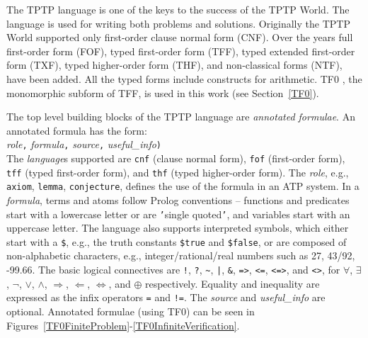 \documentclass[letterpaper]{article}
\newcommand{\smalltt}[1]{\small \texttt{#1}}
\begin{document}
The TPTP language \cite{Sut22-IGPL} is one of the keys to the success of the TPTP World.
The language is used for writing both problems and solutions.
Originally the TPTP World supported only first-order clause normal form (CNF).
Over the years full first-order form (FOF),
typed first-order form (TFF),
typed extended first-order form (TXF),
typed higher-order form (THF),
and non-classical forms (NTF),
have been added.
All the typed forms include constructs for arithmetic.
TF0 \cite{SS+12}, the monomorphic subform of TFF, is used in this work (see Section~\ref{TF0}).

The top level building blocks of the TPTP language are {\em annotated formulae}.
An annotated formula has the form:\\
{\em role}{\tt ,}
{\em formula}{\tt ,}
{\em source}{\tt ,}
{\em useful\_info}{\tt )}\\
The {\em language}s supported are {\smalltt{cnf}} (clause normal form), {\smalltt{fof}}
(first-order form), {\smalltt{tff}} (typed first-order form), and {\smalltt{thf}}
(typed higher-order form).
The {\em role}, e.g., {\smalltt{axiom}}, {\smalltt{lemma}}, {\smalltt{conjecture}},
defines the use of the formula in an ATP system.
In a {\em formula}, terms and atoms follow Prolog conventions
-- functions and predicates start with a lowercase letter or are {\tt '}single quoted{\tt '}, and 
variables start with an uppercase letter.
The language also supports interpreted symbols, which either start with a {\tt \$}, e.g., 
the truth constants {\smalltt{\$true}} and {\smalltt{\$false}}, or are composed of 
non-alphabetic characters, e.g., integer/rational/real numbers such as 27, 43/92, -99.66.
The basic logical connectives are
{\tt !}, {\tt ?}, {\tt \verb|~|}, {\tt |}, {\tt \&}, {\tt =>}, {\tt <=}, {\tt <=>}, and 
{\tt <{\raisebox{0.4ex}{\texttildelow}}>},
for
$\forall$, $\exists$, $\neg$, $\vee$, $\wedge$, $\Rightarrow$, $\Leftarrow$, $\Leftrightarrow$, 
and $\oplus$ respectively.
Equality and inequality are expressed as the infix operators {\tt =} and {\tt !=}.
The {\em source} and {\em useful\_info} are optional.
Annotated formulae (using TF0) can be seen in 
Figures~\ref{TF0FiniteProblem}-\ref{TF0InfiniteVerification}.
\end{document}
